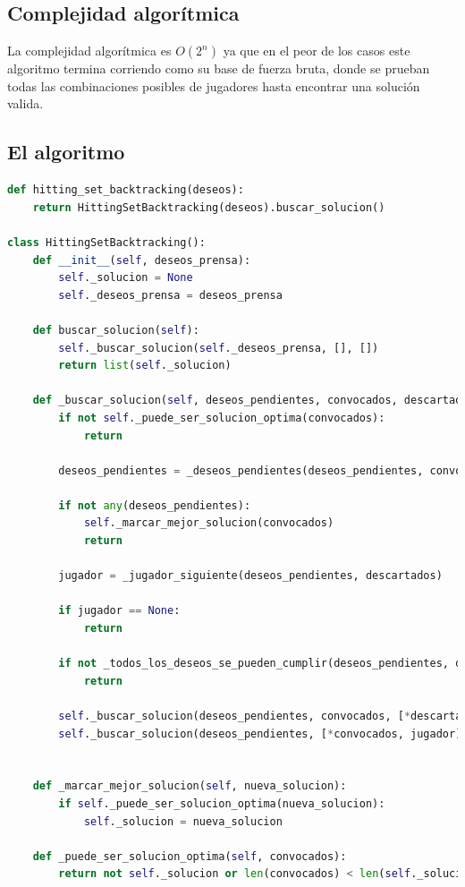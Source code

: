 \documentclass{estilo}
\begin{document}
\subsection{Complejidad algorítmica}

La complejidad algorítmica es $O(2^n)$ ya que en el peor de los casos este algoritmo termina corriendo como su base de fuerza bruta, donde se prueban todas las combinaciones posibles de jugadores hasta encontrar una solución valida.

\newpage
\subsection{El algoritmo}
\begin{lstlisting}[language=Python]
def hitting_set_backtracking(deseos):
    return HittingSetBacktracking(deseos).buscar_solucion()

class HittingSetBacktracking():
    def __init__(self, deseos_prensa):
        self._solucion = None
        self._deseos_prensa = deseos_prensa
    
    def buscar_solucion(self):
        self._buscar_solucion(self._deseos_prensa, [], [])
        return list(self._solucion)

    def _buscar_solucion(self, deseos_pendientes, convocados, descartados):
        if not self._puede_ser_solucion_optima(convocados):
            return
            
        deseos_pendientes = _deseos_pendientes(deseos_pendientes, convocados)
        
        if not any(deseos_pendientes):
            self._marcar_mejor_solucion(convocados)
            return
    
        jugador = _jugador_siguiente(deseos_pendientes, descartados)
    
        if jugador == None:
            return
    
        if not _todos_los_deseos_se_pueden_cumplir(deseos_pendientes, descartados):
            return
                
        self._buscar_solucion(deseos_pendientes, convocados, [*descartados, jugador])
        self._buscar_solucion(deseos_pendientes, [*convocados, jugador], descartados)


    def _marcar_mejor_solucion(self, nueva_solucion):
        if self._puede_ser_solucion_optima(nueva_solucion):
            self._solucion = nueva_solucion
        
    def _puede_ser_solucion_optima(self, convocados):
        return not self._solucion or len(convocados) < len(self._solucion)


\end{lstlisting}
\end{document}
